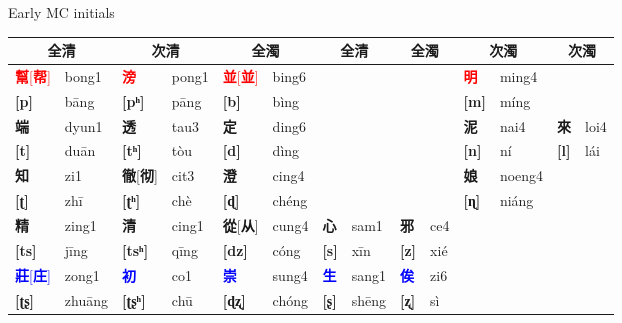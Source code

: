 \documentclass{beamer}
\begin{document}
\begin{frame}[fragile]{Early MC initials}

\begin{adjustwidth}{-1.5em}{-1.5em}
\begin{table}
        \flushleft
        {\scriptsize
        \setlength{\tabcolsep}{1pt}
        \renewcommand{\arraystretch}{1.2}
        \begin{tabular}{l l | l l | l l | l l | l l | l l | l l}
            \hline
            \multicolumn{2}{c}{全清} & \multicolumn{2}{c}{次清} & \multicolumn{2}{c}{全濁} & \multicolumn{2}{c}{全清} & \multicolumn{2}{c}{全濁} & \multicolumn{2}{c}{次濁} & \multicolumn{2}{c}{次濁}\\
            \hline
            \textcolor{red}{\textbf{幫}[\textbf{帮}]} & bong1 & \textcolor{red}{\textbf{滂}} & pong1 & \textcolor{red}{\textbf{並}[\textbf{並}]} & bing6 & & & & & \textcolor{red}{\textbf{明}} & ming4 & & \\
            \textbf{[p]}& bāng & \textbf{[pʰ]}& pāng & \textbf{[b]}& bìng & & & & & \textbf{[m]}& míng & & \\ \hline
            \textbf{端} & dyun1 & \textbf{透} & tau3 & \textbf{定} & ding6 & & & & & \textbf{泥} & nai4 & \textbf{來} & loi4\\
            \textbf{[t]} & duān & \textbf{[tʰ]} & tòu & \textbf{[d]} & dìng & & & & & \textbf{[n]} & ní & \textbf{[l]} & lái \\ \hline
            \textbf{知} & zi1 & \textbf{徹}[\textbf{彻}] & cit3 & \textbf{澄} & cing4 & & & & & \textbf{娘} & noeng4 & & \\
            \textbf{[ʈ]} & zhī & \textbf{[ʈʰ]} & chè & \textbf{[ɖ]} & chéng & & & & & \textbf{[ɳ]} & niáng & & \\ \hline
            \textbf{精} & zing1 & \textbf{清} & cing1 & \textbf{從}[\textbf{从}] & cung4 & \textbf{心} & sam1 & \textbf{邪} & ce4 & & & & \\
            \textbf{[ts]} & jīng & \textbf{[tsʰ]} & qīng & \textbf{[dz]} & cóng & \textbf{[s]} & xīn & \textbf{[z]} & xié & & & & \\ \hline
              \textcolor{blue}{\textbf{莊}[\textbf{庄}]} & zong1 & \textcolor{blue}{\textbf{初}} & co1 & \textcolor{blue}{\textbf{崇}} & sung4 & \textcolor{blue}{\textbf{生}} & sang1 & \textcolor{blue}{\textbf{俟}} & zi6 & & & & \\
            \textbf{[ʈʂ]} & zhuāng & \textbf{[ʈʂʰ]} & chū & \textbf{[ɖʐ]} & chóng & \textbf{[ʂ]} & shēng & \textbf{[ʐ]} & sì & & & & \\ \hline

\end{tabular}}
\end{table}
\end{adjustwidth}
\end{frame}
\end{document}
